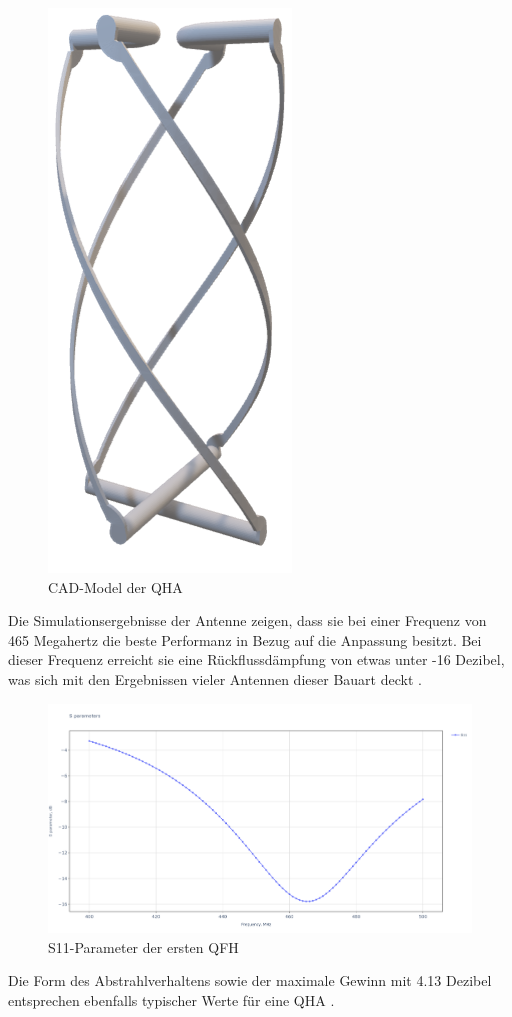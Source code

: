 \begin{figure} [H]
	\centering
	\includegraphics[width=.25\linewidth]{../ref/qfh_render.png}
	\caption{CAD-Model der QHA}
	\label{fig:qfh_render}
\end{figure}

Die Simulationsergebnisse der Antenne zeigen, dass sie bei einer Frequenz von 465 Megahertz die beste Performanz in Bezug auf die Anpassung besitzt. Bei dieser Frequenz erreicht sie eine Rückflussdämpfung von etwas unter -16 Dezibel, was sich mit den Ergebnissen vieler Antennen dieser Bauart deckt \cite{noauthor_qfh_nodate} \cite{keller_quadrifilar_2015}.

\begin{figure} [H]
	\centering
	\includegraphics[width=\linewidth]{../ref/qfh_old_s11.png}
	\caption{S11-Parameter der ersten QFH}
	\label{fig:s11_old_qfh}
\end{figure}

Die Form des Abstrahlverhaltens sowie der maximale Gewinn mit 4.13 Dezibel entsprechen ebenfalls typischer Werte für eine QHA \cite{keller_quadrifilar_2015}.

